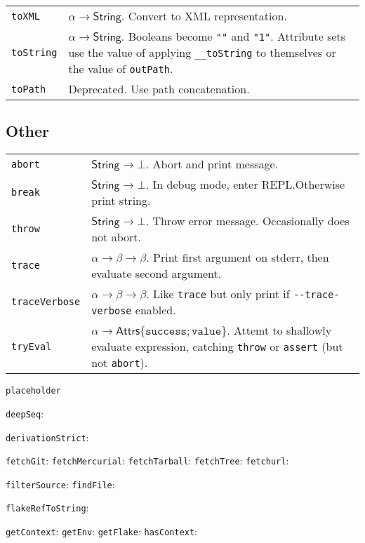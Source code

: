 \documentclass[9pt, a4paper, landscape]{extarticle}
\newcommand{\cmd}[1]{\texttt{#1}}
\newcommand{\str}{\textsf{String}}
\newcommand{\ats}{\textsf{Attrs}}
\begin{document}
\begin{multicols*}{3}
\begin{tabularx}{\columnwidth}{@{}l>{\raggedright\arraybackslash}X@{}}
  \cmd{toXML} & $\alpha\to\str$. Convert to XML representation. \\

  \cmd{toString} & $\alpha\to\str$. Booleans become \cmd{""} and
  \cmd{"1"}. Attribute sets use the value of applying
  \cmd{\_\_toString} to themselves or the value of \cmd{outPath}. \\

  \cmd{toPath} & Deprecated. Use path concatenation. \\
\end{tabularx}

\subsection*{Other}

\begin{tabularx}{\columnwidth}{@{}l>{\raggedright\arraybackslash}X@{}}
  \cmd{abort} & $\str \to \bot $. Abort and print message. \\

  \cmd{break} & $\str \to \bot $. In debug mode, enter REPL.\@ Otherwise
  print string.\\

  \cmd{throw} & $\str\to\bot$. Throw error message. Occasionally does not
  abort. \\

  \cmd{trace} & $\alpha\to\beta\to\beta$. Print first argument on stderr, then evaluate
  second argument. \\

  \cmd{traceVerbose} &  $\alpha\to\beta\to\beta$. Like \cmd{trace} but only print if
  \cmd{{-}{-}trace-verbose} enabled. \\

  \cmd{tryEval} & $\alpha\to\ats\{\cmd{success}; \cmd{value}\}$. Attemt to
  shallowly evaluate expression, catching \cmd{throw} or \cmd{assert}
  (but not \cmd{abort}). 
\end{tabularx}


\cmd{placeholder} 

\cmd{deepSeq}:

\cmd{derivationStrict}:

\cmd{fetchGit}:
\cmd{fetchMercurial}:
\cmd{fetchTarball}:
\cmd{fetchTree}:
\cmd{fetchurl}:

\cmd{filterSource}:
\cmd{findFile}:

\cmd{flakeRefToString}:

\cmd{getContext}:
\cmd{getEnv}:
\cmd{getFlake}:
\cmd{hasContext}:


\end{multicols*}
\end{document}
